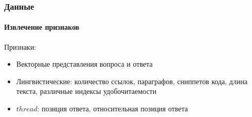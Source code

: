 \documentclass[10pt]{beamer}
\begin{document}

\begin{frame}
\frametitle{Данные}
\framesubtitle{Извлечение признаков}

Признаки:

\begin{itemize}
	\item Векторные представления вопроса и ответа
	\item Лингвистические: количество ссылок, параграфов, сниппетов кода, длина текста, различные индексы удобочитаемости
	\item $thread$: позиция ответа, относительная позиция ответа
\end{itemize}

\end{frame}

\end{document}
